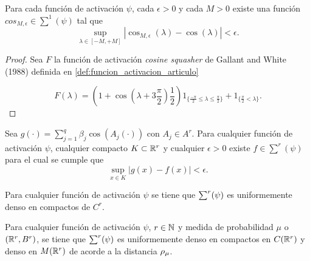 \begin{lema}
    Para cada función de activación $\psi$, cada $\epsilon >0$
    y cada $M>0$ existe una función 
    $cos_{M,\epsilon} \in \sum^1(\psi)$ tal que 
    \begin{equation}
        \sup_{ \lambda \in [-M, +M]}
        |\cos_{M,\epsilon}(\lambda) - \cos(\lambda)|
        < 
        \epsilon. 
    \end{equation}
\end{lema}
\begin{proof}
    Sea $F$ la función de activación \textit{cosine squasher} de Gallant and White (1988) definida en \ref{def:funcion_activacion_articulo}

    \begin{equation}
        F(\lambda )= \left(1 + \cos\left(\lambda + 3 \frac{\pi}{2} \right) \frac{1}{2}\right) 
         1_{\{\frac{-\pi}{2} \leq \lambda \leq  \frac{\pi}{2}\}}
         +
         1_{\{ \frac{\pi}{2} < \lambda \}}.
        \end{equation}
\end{proof}

\begin{lema}
    Sea $g(\cdot) = \sum_{j=1}^q \beta_j \cos(A_j(\cdot))$ con 
    $A_j \in A^r$. 
    Para cualquier función de activación $\psi$, 
    cualquier compacto $K \subset \mathbb{R}^r$
    y cualquier $\epsilon > 0$
    existe $f \in \sum^r(\psi)$ para el cual se cumple que 
    \begin{equation}
        \sup_{x \in K} 
        |g(x) - f(x)| < \epsilon.
    \end{equation}
\end{lema}

\begin{lema}
    Para cualquier función de activación $\psi$ se tiene que 
    $\sum^r (\psi)$ es uniformemente denso en compactos de $C^r.$
\end{lema}

\begin{teorema}
    Para cualquier función de activación $\psi$, $r \in \mathbb{N}$ y
    medida de probabilidad $\mu$ o $(\mathbb{R}^r, B^r)$, 
    se tiene que $\sum^r (\psi)$ es uniformemente denso en compactos
    en $C(\mathbb{R}^r)$ y denso en $M(\mathbb{R}^r)$ de acorde a la distancia $\rho_{\mu}$. 
\end{teorema}